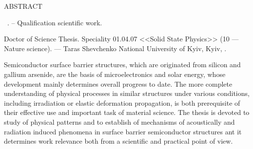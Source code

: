 \noindent
ABSTRACT						
					
\vspace{0.7cm}
\noindent
\thesisAuthorFIOen~\thesisTitleEn. --  Qualification scientific work. 

\vspace{0.7cm}
\noindent
Doctor of Science Thesis. Speciality 01.04.07 <<Solid State Physics>> (10 --- Nature science).  --- Taras 
Shevchenko National University of Kyiv, Kyiv, \thesisYear.


\vspace{0.7cm}
Semiconductor surface barrier structures, which are originated from silicon and gallium arsenide, are the basis of microelectronics and solar energy, whose development mainly determines overall progress to date.
The more complete understanding of physical processes in similar structures under various conditions, including irradiation or elastic deformation propagation, is both prerequisite of their effective use and important task of material science.
The thesis is devoted to study of physical patterns and to establish of mechanisms of acoustically  and radiation induced phenomena in surface barrier semiconductor structures ant it determines work relevance both from a scientific and practical point of view.

